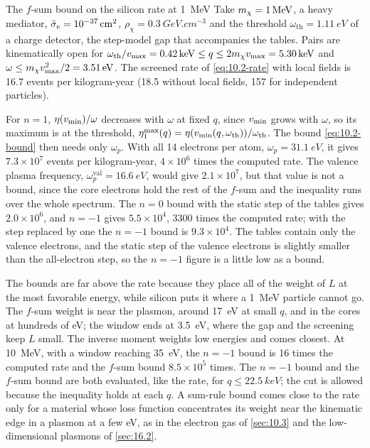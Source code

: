 \begin{workedexample}{The $f$-sum bound on the silicon rate at \SI{1}{MeV}}\label{we:10-fsum}
Take $m_{\chi} = \SI{1}{MeV}$, a heavy mediator, $\bar{\sigma}_{e} = \SI{e-37}{cm^2}$, $\rho_\chi = \SI{0.3}{GeV.cm^{-3}}$ and the threshold $\omega_{\mathrm{th}} = \SI{1.11}{eV}$ of a charge detector, the step-model gap that accompanies the tables. Pairs are kinematically open for $\omega_{\mathrm{th}}/v_{\mathrm{max}} = \SI{0.42}{keV} \le q \le 2m_{\chi} v_{\mathrm{max}} = \SI{5.30}{keV}$ and $\omega \le m_{\chi} v_{\mathrm{max}}^2/2 = \SI{3.51}{eV}$. The screened rate of \cref{eq:10.2-rate} with local fields is 16.7 events per kilogram-year (18.5 without local fields, 157 for independent particles).

For $n = 1$, $\eta(v_{\mathrm{min}})/\omega$ decreases with $\omega$ at fixed $q$, since $v_{\mathrm{min}}$ grows with $\omega$, so its maximum is at the threshold, $\eta_1^{\max}(q) = \eta(v_{\mathrm{min}}(q,\omega_{\mathrm{th}}))/\omega_{\mathrm{th}}$. The bound \cref{eq:10.2-bound} then needs only $\omega_p$. With all 14 electrons per atom, $\omega_p = \SI{31.1}{eV}$, it gives $7.3\times10^7$ events per kilogram-year, $4\times10^6$ times the computed rate. The valence plasma frequency, $\omega_p^{\mathrm{val}} = \SI{16.6}{eV}$, would give $2.1\times10^7$, but that value is not a bound, since the core electrons hold the rest of the $f$-sum and the inequality runs over the whole spectrum. The $n = 0$ bound with the static step of the tables gives $2.0\times10^6$, and $n = -1$ gives $5.5\times10^4$, 3300 times the computed rate; with the step replaced by one the $n = -1$ bound is $9.3\times10^4$. The tables contain only the valence electrons, and the static step of the valence electrons is slightly smaller than the all-electron step, so the $n = -1$ figure is a little low as a bound.

The bounds are far above the rate because they place all of the weight of $L$ at the most favorable energy, while silicon puts it where a \SI{1}{MeV} particle cannot go. The $f$-sum weight is near the plasmon, around \SI{17}{eV} at small $q$, and in the cores at hundreds of eV; the window ends at \SI{3.5}{eV}, where the gap and the screening keep $L$ small. The inverse moment weights low energies and comes closest. At \SI{10}{MeV}, with a window reaching \SI{35}{eV}, the $n = -1$ bound is 16 times the computed rate and the $f$-sum bound $8.5\times10^5$ times. The $n = -1$ bound and the $f$-sum bound are both evaluated, like the rate, for $q \le \SI{22.5}{keV}$; the cut is allowed because the inequality holds at each $q$. A sum-rule bound comes close to the rate only for a material whose loss function concentrates its weight near the kinematic edge in a plasmon at a few eV, as in the electron gas of \cref{sec:10.3} and the low-dimensional plasmons of \cref{sec:16.2}.
\end{workedexample}

